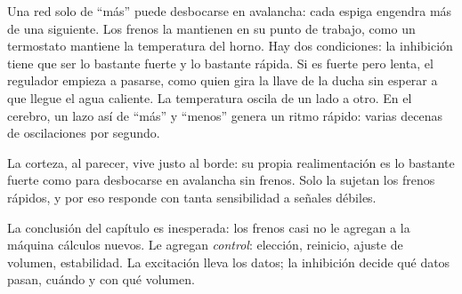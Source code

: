 Una red solo de “más” puede desbocarse en avalancha: cada espiga engendra más de una siguiente. Los frenos la mantienen en su punto de trabajo, como un termostato mantiene la temperatura del horno. Hay dos condiciones: la inhibición tiene que ser lo bastante fuerte y lo bastante rápida. Si es fuerte pero lenta, el regulador empieza a pasarse, como quien gira la llave de la ducha sin esperar a que llegue el agua caliente. La temperatura oscila de un lado a otro. En el cerebro, un lazo así de “más” y “menos” genera un ritmo rápido: varias decenas de oscilaciones por segundo.

La corteza, al parecer, vive justo al borde: su propia realimentación es lo bastante fuerte como para desbocarse en avalancha sin frenos. Solo la sujetan los frenos rápidos, y por eso responde con tanta sensibilidad a señales débiles.

La conclusión del capítulo es inesperada: los frenos casi no le agregan a la máquina cálculos nuevos. Le agregan \emph{control}: elección, reinicio, ajuste de volumen, estabilidad. La excitación lleva los datos; la inhibición decide qué datos pasan, cuándo y con qué volumen.

